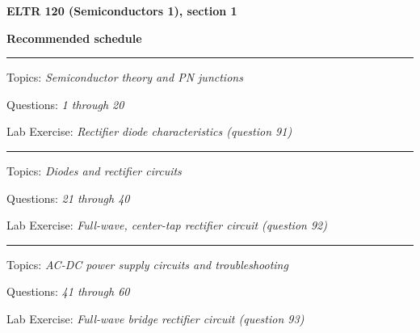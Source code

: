 
\centerline{\bf ELTR 120 (Semiconductors 1), section 1} \bigskip 
 
\vskip 10pt

\noindent
{\bf Recommended schedule}

\vskip 5pt

\hrule \vskip 5pt
\noindent
{}

\hskip 10pt Topics: {\it Semiconductor theory and PN junctions}
 
\hskip 10pt Questions: {\it 1 through 20}
 
\hskip 10pt Lab Exercise: {\it Rectifier diode characteristics (question 91)}
 




\vskip 10pt
\hrule \vskip 5pt
\noindent
{}

\hskip 10pt Topics: {\it Diodes and rectifier circuits}
 
\hskip 10pt Questions: {\it 21 through 40}
 
\hskip 10pt Lab Exercise: {\it Full-wave, center-tap rectifier circuit (question 92)}
 



\vskip 10pt
\hrule \vskip 5pt
\noindent
{}

\hskip 10pt Topics: {\it AC-DC power supply circuits and troubleshooting}
 
\hskip 10pt Questions: {\it 41 through 60}
 
\hskip 10pt Lab Exercise: {\it Full-wave bridge rectifier circuit (question 93)}
 

